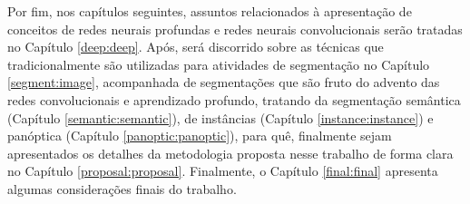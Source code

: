Por fim, nos capítulos seguintes, assuntos relacionados à apresentação de conceitos de redes neurais profundas e redes neurais convolucionais serão tratadas no Capítulo \ref{deep:deep}. Após, será discorrido sobre as técnicas que tradicionalmente são utilizadas para atividades de segmentação no Capítulo \ref{segment:image}, acompanhada de segmentações que são fruto do advento das redes convolucionais e aprendizado profundo, tratando da segmentação semântica (Capítulo \ref{semantic:semantic}), de instâncias (Capítulo \ref{instance:instance}) e panóptica (Capítulo \ref{panoptic:panoptic}), para quê, finalmente sejam apresentados os detalhes da metodologia proposta nesse trabalho de forma clara no Capítulo \ref{proposal:proposal}.  Finalmente, o Capítulo \ref{final:final} apresenta algumas considerações finais do trabalho.